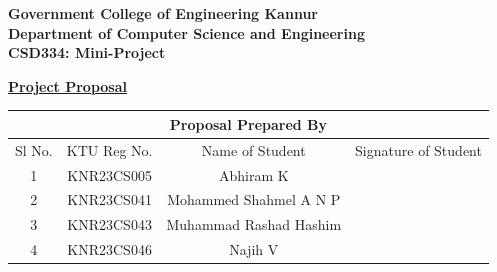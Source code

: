 \documentclass[14pt]{article}
\begin{document}
\begin{center}
\large{\textbf{Government College of Engineering Kannur\\}}
\large{\textbf{Department of Computer Science and Engineering\\}}
\large{\textbf{CSD334: Mini-Project\\}}
\end{center}

\begin{center}
\small{\textbf{\underline{ Project Proposal}\\}}
\end{center}

\begin{table}[ht!]
\begin{center}
\begin{tabular}{|cccc|}
\hline
\multicolumn{4}{|c|}{\textbf{Proposal Prepared By}}                        \\ \hline
\multicolumn{1}{|c|}{Sl No.} & \multicolumn{1}{c|}{KTU Reg No.} & \multicolumn{1}{c|}{Name of Student}              & Signature of Student \\ \hline
\multicolumn{1}{|c|}{1}      & \multicolumn{1}{c|}{KNR23CS005}   & \multicolumn{1}{c|}{Abhiram K} &           \\ \hline
\multicolumn{1}{|c|}{2} & \multicolumn{1}{c|}{KNR23CS041} & \multicolumn{1}{c|}{Mohammed Shahmel A N P} &  \\ \hline
\multicolumn{1}{|c|}{3} & \multicolumn{1}{c|}{KNR23CS043} & \multicolumn{1}{c|}{Muhammad Rashad Hashim} &  \\ \hline
\multicolumn{1}{|c|}{4} & \multicolumn{1}{c|}{KNR23CS046} & \multicolumn{1}{c|}{Najih V} &  \\ \hline
\end{tabular}
\end{center}
\end{table}
\end{document}
